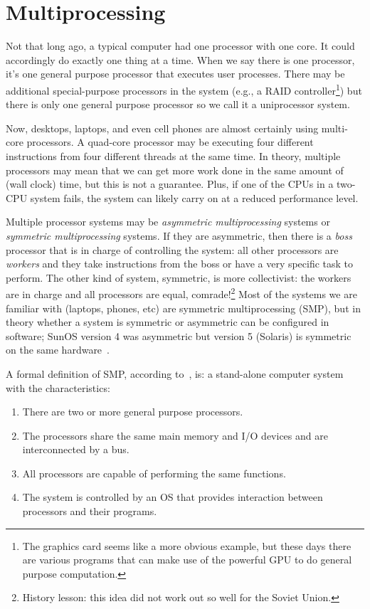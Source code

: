 




\section*{Multiprocessing}

Not that long ago, a typical computer had one processor with one core. It could accordingly do exactly one thing at a time. When we say there is one processor, it's one general purpose processor that executes user processes. There may be additional special-purpose processors in the system (e.g., a RAID controller\footnote{The graphics card seems like a more obvious example, but these days there are various programs that can make use of the powerful GPU to do general purpose computation.}) but there is only one general purpose processor so we call it a uniprocessor system.

Now, desktops, laptops, and even cell phones are almost certainly using multi-core processors. A quad-core processor may be executing four different instructions from four different threads at the same time. In theory, multiple processors may mean that we can get more work done in the same amount of (wall clock) time, but this is not a guarantee. Plus, if one of the CPUs in a two-CPU system fails, the system can likely carry on at a reduced performance level.

Multiple processor systems may be \textit{asymmetric multiprocessing} systems or \textit{symmetric multiprocessing} systems. If they are asymmetric, then there is a \textit{boss} processor that is in charge of controlling the system: all other processors are \textit{workers} and they take instructions from the boss or have a very specific task to perform. The other kind of system, symmetric, is more collectivist: the workers are in charge and all processors are equal, comrade!\footnote{History lesson: this idea did not work out so well for the Soviet Union.} Most of the systems we are familiar with (laptops, phones, etc) are symmetric multiprocessing (SMP), but in theory whether a system is symmetric or asymmetric can be configured in software; SunOS version 4 was asymmetric but version 5 (Solaris) is symmetric on the same hardware~\cite{osc}.


A formal definition of SMP, according to~\cite{osi}, is: a stand-alone computer system with the characteristics:
\begin{enumerate}
	\item There are two or more general purpose processors.
	\item The processors share the same main memory and I/O devices and are interconnected by a bus.
	\item All processors are capable of performing the same functions.
	\item The system is controlled by an OS that provides interaction between processors and their programs.
\end{enumerate}

